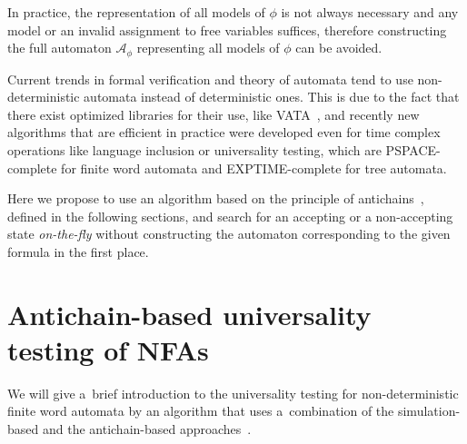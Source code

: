 In practice, the representation of all models of $\phi$ is not always necessary
and any model or an invalid assignment to free variables suffices, therefore
constructing the full automaton $\mathcal{A}_{\phi}$ representing all models of
$\phi$ can be avoided.

Current trends in formal verification and theory of automata tend to use
non-deter\-ministic automata instead of deterministic ones. This is due to the
fact that there exist optimized libraries for their use, like VATA~\cite{vata},
and recently new algorithms that are efficient in practice were developed even
for time complex operations like language inclusion or universality testing,
which are PSPACE-complete for finite word automata and EXPTIME-complete for tree
automata.

Here we propose to use an algorithm based on the principle of
antichains~\cite{tacas}, defined in the following sections, and search for an
accepting or a non-accepting state \emph{on-the-fly} without constructing the
automaton corresponding to the given formula in the first place.

\section{Antichain-based universality testing of NFAs}

We will give a~brief introduction to the universality testing for
non-deterministic finite word automata by an algorithm that uses a~combination
of the simulation-based and the antichain-based approaches~\cite{tacas}.


